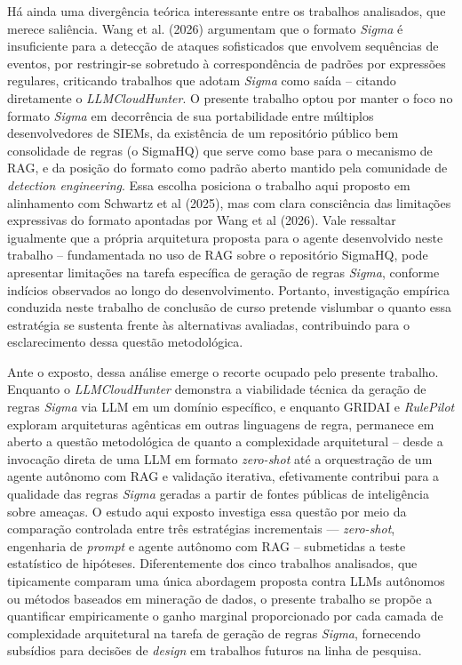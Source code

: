 Há ainda uma divergência teórica interessante entre os trabalhos analisados, que merece saliência. 
Wang et al. (2026) argumentam que o formato \textit{Sigma} é insuficiente para a detecção de ataques sofisticados que envolvem sequências de eventos, por restringir-se sobretudo à correspondência de padrões por expressões regulares, criticando trabalhos que adotam \textit{Sigma} como saída -- citando diretamente o \textit{LLMCloudHunter}. 
O presente trabalho optou por manter o foco no formato \textit{Sigma} em decorrência de sua portabilidade entre múltiplos desenvolvedores de \gls{SIEM}s, da existência de um repositório público bem consolidade de regras (o \gls{SigmaHQ})  que serve como base para o mecanismo de RAG, e da posição do formato como padrão aberto mantido pela comunidade de \textit{detection engineering}. 
Essa escolha posiciona o trabalho aqui proposto em alinhamento com Schwartz et al (2025), mas com clara consciência das limitações expressivas do formato apontadas por Wang et al (2026).
Vale ressaltar igualmente que a própria arquitetura proposta para o agente desenvolvido neste trabalho -- fundamentada no uso de RAG sobre o repositório \gls{SigmaHQ}, pode apresentar limitações na tarefa específica de geração de regras \textit{Sigma}, conforme indícios observados ao longo do desenvolvimento. 
Portanto, investigação empírica conduzida neste trabalho de conclusão de curso pretende vislumbar o quanto essa estratégia se sustenta frente às alternativas avaliadas, contribuindo para o esclarecimento dessa questão metodológica.

Ante o exposto, dessa análise emerge o recorte ocupado pelo presente trabalho. 
Enquanto o \textit{LLMCloudHunter} demonstra a viabilidade técnica da geração de regras \textit{Sigma} via LLM em um domínio específico, e enquanto GRIDAI e \textit{RulePilot} exploram arquiteturas agênticas em outras linguagens de regra, permanece em aberto a questão metodológica de quanto a complexidade arquitetural -- desde a invocação direta de uma LLM em formato \textit{\gls{zero-shot}} até a orquestração de um agente autônomo com RAG e validação iterativa, efetivamente contribui para a qualidade das regras \textit{Sigma} geradas a partir de fontes públicas de inteligência sobre ameaças. 
O estudo aqui exposto investiga essa questão por meio da comparação controlada entre três estratégias incrementais — \textit{\gls{zero-shot}}, engenharia de \textit{prompt} e agente autônomo com RAG -- submetidas a teste estatístico de hipóteses. 
Diferentemente dos cinco trabalhos analisados, que tipicamente comparam uma única abordagem proposta contra LLMs autônomos ou métodos baseados em mineração de dados, o presente trabalho se propõe a quantificar empiricamente o ganho marginal proporcionado por cada camada de complexidade arquitetural na tarefa de geração de regras \textit{Sigma}, fornecendo subsídios para decisões de \textit{design} em trabalhos futuros na linha de pesquisa.



